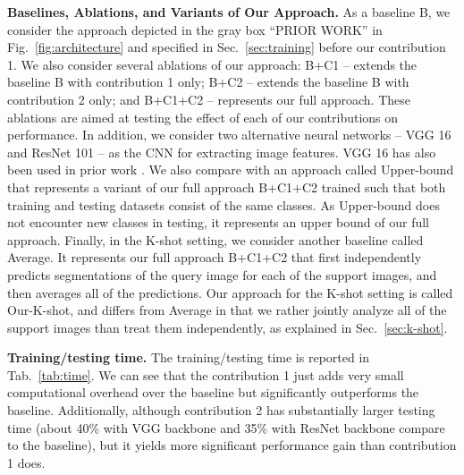 \documentclass[10pt,twocolumn,letterpaper]{article}
\begin{document}
{\bf Baselines, Ablations, and Variants of Our Approach.}
As a baseline B, we consider the approach depicted in the gray box ``PRIOR WORK'' in Fig.~\ref{fig:architecture} and specified in Sec.~\ref{sec:training} before our contribution 1. We also consider several ablations of our approach: B+C1 -- extends the baseline B with contribution 1 only; B+C2 -- extends the baseline B with contribution 2 only; and B+C1+C2 -- represents our full approach. These ablations are aimed at testing the effect of each of our contributions on performance. In addition, we consider two alternative neural networks -- VGG 16 and ResNet 101 -- as the CNN for extracting image features. VGG 16 has also been used in prior work \cite{shaban2017one,rakelly2018conditional,dong2018few}. We also compare with an approach called Upper-bound that represents a variant of our full approach B+C1+C2 trained such that both training and testing datasets consist of the same classes. As Upper-bound does not encounter new classes in testing, it represents an upper bound of our full approach. Finally, in the K-shot setting, we consider another baseline called Average. It represents our full approach B+C1+C2 that first independently predicts segmentations of the query image for each of the  support images, and then averages all of the predictions. Our approach for the K-shot setting is called Our-K-shot, and differs from Average in that we rather jointly analyze all of the  support images than treat them independently, as explained in Sec.~\ref{sec:k-shot}.

{\bf Training/testing time.}
The training/testing time is reported in Tab.~\ref{tab:time}. We can see that the contribution 1 just adds very small computational overhead over the baseline but significantly outperforms the baseline. Additionally, although contribution 2 has substantially larger testing time (about 40\% with VGG backbone and 35\% with ResNet backbone compare to the baseline), but it yields more significant performance gain than contribution 1 does. 
\end{document}
